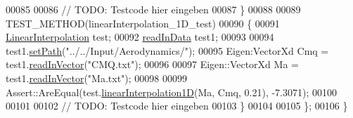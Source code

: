 \begin{DoxyCode}
00085 
00086             \textcolor{comment}{// TODO: Testcode hier eingeben}
00087         \}
00088 
00089         TEST\_METHOD(linearInterpolation\_1D\_test)
00090         \{
00091             \hyperlink{class_linear_interpolation}{LinearInterpolation} test;
00092             \hyperlink{classread_in_data}{readInData} test1;
00093 
00094             test1.\hyperlink{classread_in_data_ad67d566fd837f6d721db279144d484e0}{setPath}(\textcolor{stringliteral}{"../../Input/Aerodynamics/"});
00095             Eigen:VectorXd Cmq = test1.\hyperlink{classread_in_data_ab57aff38529234593d786ecace301cf7}{readInVector}(\textcolor{stringliteral}{"CMQ.txt"});
00096 
00097             Eigen::VectorXd Ma = test1.\hyperlink{classread_in_data_ab57aff38529234593d786ecace301cf7}{readInVector}(\textcolor{stringliteral}{"Ma.txt"});
00098 
00099             Assert::AreEqual(test.\hyperlink{class_linear_interpolation_a76b750166902dedda7e44ed0b8170094}{linearInterpolation1D}(Ma, Cmq, 0.21), -7.3071);
00100 
00101 
00102             \textcolor{comment}{// TODO: Testcode hier eingeben}
00103         \}
00104 
00105     \};
00106 \}
\end{DoxyCode}
